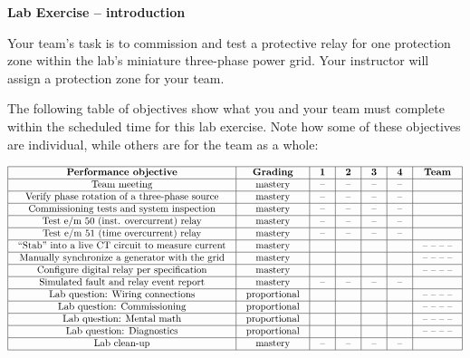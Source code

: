 

\noindent
{\bf Lab Exercise -- introduction}

\vskip 5pt

Your team's task is to commission and test a protective relay for one protection zone within the lab's miniature three-phase power grid.  Your instructor will assign a protection zone for your team.

The following table of objectives show what you and your team must complete within the scheduled time for this lab exercise.  Note how some of these objectives are individual, while others are for the team as a whole:



$$\vbox{\offinterlineskip
\halign{\strut
\vrule \quad\hfil # \ \hfil & 
\vrule \quad\hfil # \ \hfil & 
\vrule \quad\hfil # \ \hfil & 
\vrule \quad\hfil # \ \hfil & 
\vrule \quad\hfil # \ \hfil & 
\vrule \quad\hfil # \ \hfil & 
\vrule \quad\hfil # \ \hfil \vrule \cr
\noalign{\hrule}
%
{\bf Performance objective} & {\bf Grading} & {\bf 1} & {\bf 2} & {\bf 3} & {\bf 4} & {\bf Team} \cr
%
\noalign{\hrule}
%
Team meeting & mastery & -- & -- & -- & -- & \cr
%
\noalign{\hrule}
%
Verify phase rotation of a three-phase source & mastery & -- & -- & -- & -- &  \cr
%
\noalign{\hrule}
%
Commissioning tests and system inspection & mastery & -- & -- & -- & -- &  \cr
%
\noalign{\hrule}
%
Test e/m 50 (inst. overcurrent) relay & mastery & -- & -- & -- & -- &  \cr
%
\noalign{\hrule}
%
Test e/m 51 (time overcurrent) relay & mastery & -- & -- & -- & -- &  \cr
%
\noalign{\hrule}
%
``Stab'' into a live CT circuit to measure current & mastery & & & & & -- -- -- -- \cr
%
\noalign{\hrule}
%
Manually synchronize a generator with the grid & mastery & & & & & -- -- -- -- \cr
%
\noalign{\hrule}
%
Configure digital relay per specification & mastery & & & & & -- -- -- -- \cr
%
\noalign{\hrule}
%
Simulated fault and relay event report & mastery & -- & -- & -- & -- &  \cr
%
\noalign{\hrule}
%
Lab question: Wiring connections & proportional &  &  &  &  & -- -- -- -- \cr
%
\noalign{\hrule}
%
Lab question: Commissioning & proportional &  &  &  &  & -- -- -- -- \cr
%
\noalign{\hrule}
%
Lab question: Mental math & proportional &  &  &  &  & -- -- -- -- \cr
%
\noalign{\hrule}
%
Lab question: Diagnostics & proportional &  &  &  &  & -- -- -- -- \cr
%
\noalign{\hrule}
%
Lab clean-up & mastery & -- & -- & -- & -- &  \cr
%
\noalign{\hrule}
} %
}$$ %

